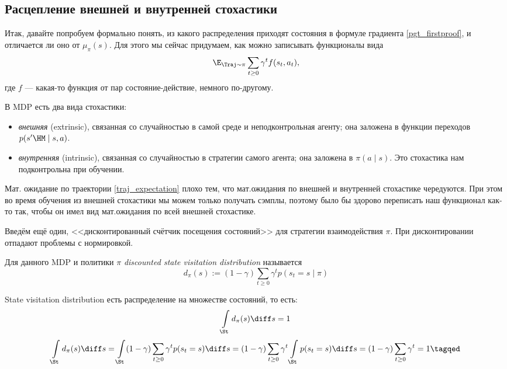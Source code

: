\subsection{Расцепление внешней и внутренней стохастики}

Итак, давайте попробуем формально понять, из какого распределения приходят состояния в формуле градиента \eqref{pgt_firstproof}, и отличается ли оно от $\mu_{\pi}(s)$. Для этого мы сейчас придумаем, как можно записывать функционалы вида
$$\E_{\Traj \sim \pi} \sum_{t \ge 0} \gamma^t f(s_t, a_t),$$
где $f$ --- какая-то функция от пар состояние-действие, немного по-другому.

В MDP есть два вида стохастики:
\begin{itemize}
    \item \emph{внешняя} (extrinsic), связанная со случайностью в самой среде и неподконтрольная агенту; она заложена в функции переходов $p(s' \HM\mid s, a)$.
    \item \emph{внутренняя} (intrinsic), связанная со случайностью в стратегии самого агента; она заложена в $\pi(a \mid s)$. Это стохастика нам подконтрольна при обучении.
\end{itemize}

Мат. ожидание по траектории \eqref{traj_expectation} плохо тем, что мат.ожидания по внешней и внутренней стохастике чередуются. При этом во время обучения из внешней стохастики мы можем только получать сэмплы, поэтому было бы здорово переписать наш функционал как-то так, чтобы он имел вид мат.ожидания по всей внешней стохастике.

Введём ещё один, <<дисконтированный счётчик посещения состояний>> для стратегии взаимодействия $\pi$. При дисконтировании отпадают проблемы с нормировкой.

\begin{definition} 
Для данного MDP и политики $\pi$ \emph{discounted state visitation distribution} называется
\begin{equation}\label{svd}
d_\pi(s) := (1 - \gamma ) \sum_{t \ge 0} \gamma^t p(s_t = s \mid \pi)
\end{equation}
\end{definition}

\begin{proposition} State visitation distribution есть распределение на множестве состояний, то есть:
$$
\int\limits_{\St} d_\pi(s) \diff s = 1
$$
\beginproof
\begin{equation*}
\int\limits_{\St} d_\pi(s) \diff s = \int\limits_{\St} (1 - \gamma )  \sum_{t \ge 0} \gamma^t p(s_t = s) \diff s  = (1 - \gamma ) \sum_{t \ge 0} \gamma^t \int\limits_{\St} p(s_t = s) \diff s = (1 - \gamma ) \sum_{t \ge 0} \gamma^t = 1   \tagqed
\end{equation*}
\end{proposition}

